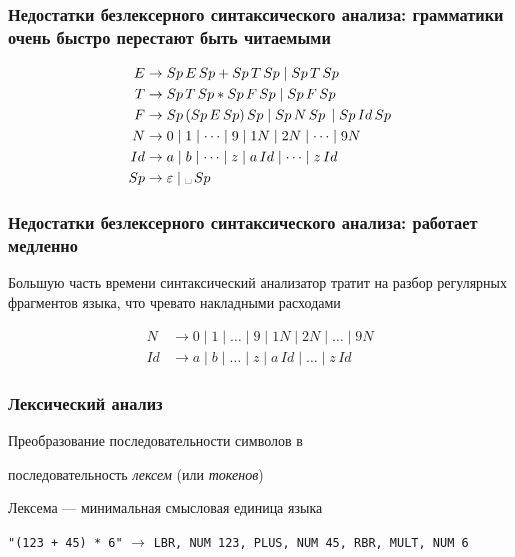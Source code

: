\documentclass{beamer}
\begin{document}
\begin{frame}[fragile]
  \frametitle{Недостатки безлексерного синтаксического анализа: грамматики очень быстро перестают быть читаемыми}

  \begin{align*}
    E &\to Sp \, E \, Sp + Sp \, T \, Sp \mid Sp \, T \, Sp \\
    T &\to Sp \, T \, Sp * Sp \, F \, Sp \mid Sp \, F \, Sp  \\
    F &\to Sp \, ( Sp \, E \, Sp) \, Sp \mid Sp \, N \, Sp \, \mid Sp \, Id \, Sp \\
    N &\to 0 \mid 1 \mid \dots \mid 9 \mid 1N \mid 2N \mid \dots \mid 9N \\
    Id &\to a \mid b \mid \dots \mid z \mid a \, Id \mid \dots \mid z \, Id \\
    Sp &\to \varepsilon \mid \text{\textvisiblespace} \, Sp
  \end{align*}
\end{frame}

\begin{frame}[fragile]
  \frametitle{Недостатки безлексерного синтаксического анализа: работает медленно}

  Большую часть времени синтаксический анализатор тратит на разбор регулярных фрагментов языка, что чревато накладными расходами

  \begin{align*}
    N &\to 0 \mid 1 \mid \dots \mid 9 \mid 1N \mid 2N \mid \dots \mid 9N \\
    Id &\to a \mid b \mid \dots \mid z \mid a \, Id \mid \dots \mid z \, Id
  \end{align*}
\end{frame}

\begin{frame}[fragile]
  \frametitle{Лексический анализ}
\begin{center}
  Преобразование последовательности символов в

  последовательность \emph{лексем} (или \emph{токенов})
\end{center}

\begin{center}
  Лексема --- минимальная смысловая единица языка
\end{center}

\bigskip

\verb!"(123 + 45) * 6"! $\to$ \verb!LBR, NUM 123, PLUS, NUM 45, RBR, MULT, NUM 6!

\end{frame}
\end{document}
